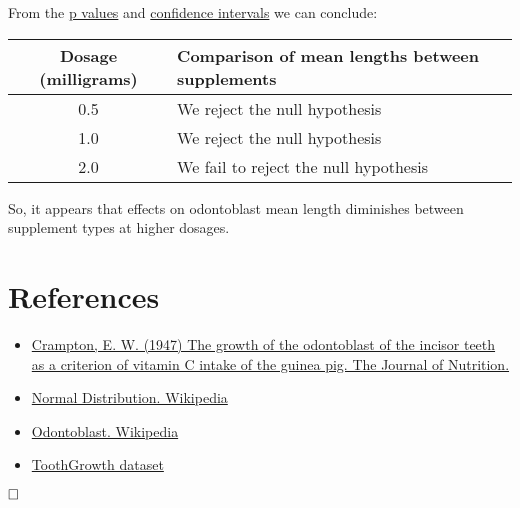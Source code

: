 \documentclass[legalpaper]{article}
\begin{document}
From the \href{https://en.wikipedia.org/wiki/P-value}{p values} and
\href{https://en.wikipedia.org/wiki/Confidence_interval}{confidence
intervals} we can conclude:

\begin{longtable}[c]{@{}cl@{}}
\toprule
Dosage (milligrams) & Comparison of mean lengths between
supplements\tabularnewline
\midrule
\endhead
0.5 & We reject the null hypothesis\tabularnewline
1.0 & We reject the null hypothesis\tabularnewline
2.0 & We fail to reject the null hypothesis\tabularnewline
\bottomrule
\end{longtable}

So, it appears that effects on odontoblast mean length diminishes
between supplement types at higher dosages.

\section{References}\label{references}

\begin{itemize}
\itemsep1pt\parskip0pt
\item
  \href{http://jn.nutrition.org/content/33/5/491.full.pdf}{Crampton, E.
  W. (1947) The growth of the odontoblast of the incisor teeth as a
  criterion of vitamin C intake of the guinea pig. The Journal of
  Nutrition.}
\item
  \href{https://en.wikipedia.org/wiki/Normal_distribution}{Normal
  Distribution. Wikipedia}
\item
  \href{https://en.wikipedia.org/wiki/Odontoblast}{Odontoblast.
  Wikipedia}
\item
  \href{https://stat.ethz.ch/R-manual/R-devel/library/datasets/html/ToothGrowth.html}{ToothGrowth
  dataset}
\end{itemize}

\(\hfill \square\)
\end{document}
